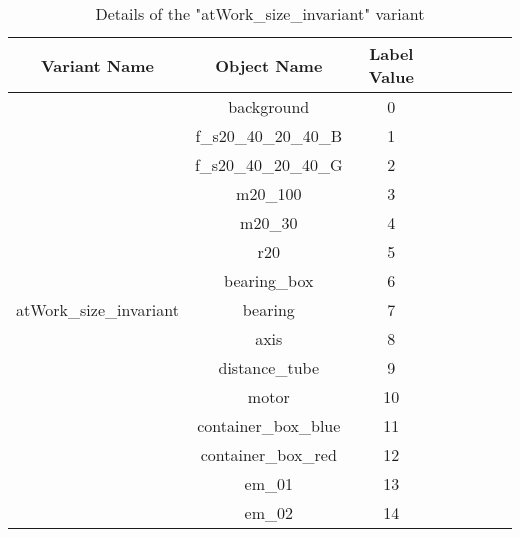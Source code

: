 \documentclass[paper=a4,11pt,parskip=half,toc=listof]{scrartcl}
\begin{document}
\begin{itemize}
		\begin{table}[!htb]
			\centering
			\begin{tabular}{|c|c|c|c|c|c|c|c|}
			\hline 
  			\textbf{Variant Name} & \textbf{Object Name} & \textbf{Label Value} \\ 
			\hline
			\multirow{15}{*}{atWork\_size\_invariant} & background & 0 \\ 
			\cline{2-3}%
			 & f\_s20\_40\_20\_40\_B & 1 \\ 
			\cline{2-3} 
			& f\_s20\_40\_20\_40\_G & 2 \\
			\cline{2-3}
			& m20\_100 & 3 \\
			\cline{2-3} 
			& m20\_30 & 4 \\
			\cline{2-3} 
			& r20 & 5 \\
			\cline{2-3} 
			& bearing\_box & 6 \\
			\cline{2-3} 
			& bearing & 7 \\
			\cline{2-3} 
			& axis & 8 \\
			\cline{2-3} 
			& distance\_tube & 9 \\
			\cline{2-3} 
			& motor & 10 \\
			\cline{2-3} 
			& container\_box\_blue & 11 \\
			\cline{2-3} 
			& container\_box\_red & 12 \\
			\cline{2-3} 
			& em\_01 & 13 \\
			\cline{2-3} 
			& em\_02 & 14 \\
			\hline
			\end{tabular}
			\caption{Details of the "atWork\_size\_invariant" variant} 
			\label{Table:size}
		\end{table}
		

\end{itemize}
\end{document}
